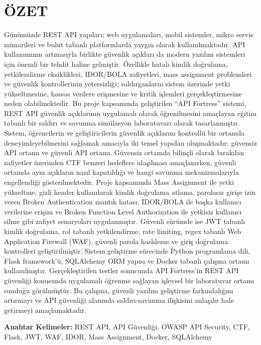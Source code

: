 \clearpage
\section*{ÖZET}
\label{ozettr}

Günümüzde REST API yapıları; web uygulamaları, mobil sistemler, mikro servis mimarileri ve bulut tabanlı platformlarda yaygın olarak kullanılmaktadır. API kullanımının artmasıyla birlikte güvenlik açıkları da modern yazılım sistemleri için önemli bir tehdit haline gelmiştir. Özellikle hatalı kimlik doğrulama, yetkilendirme eksiklikleri, IDOR/BOLA zafiyetleri, mass assignment problemleri ve güvenlik kontrollerinin yetersizliği; saldırganların sistem üzerinde yetki yükseltmesine, hassas verilere erişmesine ve kritik işlemleri gerçekleştirmesine neden olabilmektedir. Bu proje kapsamında geliştirilen ``API Fortress'' sistemi, REST API güvenlik açıklarının uygulamalı olarak öğrenilmesini amaçlayan eğitim tabanlı bir saldırı ve savunma simülasyon laboratuvarı olarak tasarlanmıştır. Sistem, öğrencilerin ve geliştiricilerin güvenlik açıklarını kontrollü bir ortamda deneyimleyebilmesini sağlamak amacıyla iki temel yapıdan oluşmaktadır: güvensiz API ortamı ve güvenli API ortamı. Güvensiz ortamda bilinçli olarak bırakılan zafiyetler üzerinden CTF benzeri hedeflere ulaşılması amaçlanırken, güvenli ortamda aynı açıkların nasıl kapatıldığı ve hangi savunma mekanizmalarıyla engellendiği gösterilmektedir. Proje kapsamında Mass Assignment ile yetki yükseltme, gizli header kullanılarak kimlik doğrulama atlama, parolasız girişe izin veren Broken Authentication mantık hatası, IDOR/BOLA ile başka kullanıcı verilerine erişim ve Broken Function Level Authorization ile yetkisiz kullanıcı silme gibi zafiyet senaryoları uygulanmıştır. Güvenli sürümde ise JWT tabanlı kimlik doğrulama, rol tabanlı yetkilendirme, rate limiting, regex tabanlı Web Application Firewall (WAF), güvenli parola hashleme ve giriş doğrulama kontrolleri geliştirilmiştir. Sistem geliştirme sürecinde Python programlama dili, Flask framework'ü, SQLAlchemy ORM yapısı ve Docker tabanlı çalışma ortamı kullanılmıştır. Gerçekleştirilen testler sonucunda API Fortress'in REST API güvenliği konusunda uygulamalı öğrenme sağlayan işlevsel bir laboratuvar ortamı sunduğu görülmüştür. Bu çalışma, güvenli yazılım geliştirme farkındalığını artırmayı ve API güvenliği alanında saldırı-savunma ilişkisini anlaşılır hale getirmeyi amaçlamaktadır.

\vspace{3mm}

\noindent \textbf{Anahtar Kelimeler:} REST API, API Güvenliği, OWASP API Security, CTF, Flask, JWT, WAF, IDOR, Mass Assignment, Docker, SQLAlchemy

\clearpage